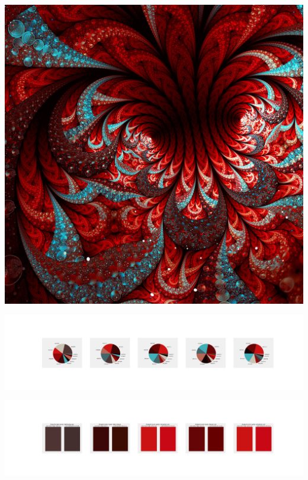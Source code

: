 \documentclass[11pt]{article}
\begin{document}
\begin{landscape}
    \begin{center}
    \includegraphics[width=\textwidth]{./nbimg/file (438).jpg}
    \end{center}

    \begin{center}
    \includegraphics[width=250mm]{./nbimg/pie-376.jpg}
    \end{center}

    \begin{center}
    \includegraphics[width=250mm]{./nbimg/peak-376.jpg}
    \end{center}
    


\end{landscape}
\end{document}
